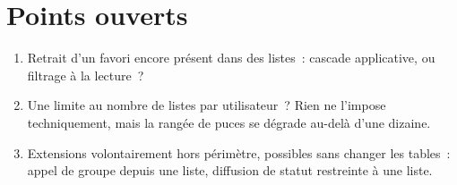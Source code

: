 \section{Points ouverts}

\begin{enumerate}[leftmargin=1.6em]
  \item Retrait d'un favori encore présent dans des listes~: cascade applicative, ou filtrage
        à la lecture~?
  \item Une limite au nombre de listes par utilisateur~? Rien ne l'impose techniquement,
        mais la rangée de puces se dégrade au-delà d'une dizaine.
  \item Extensions volontairement hors périmètre, possibles sans changer les tables~:
        appel de groupe depuis une liste, diffusion de statut restreinte à une liste.
\end{enumerate}
